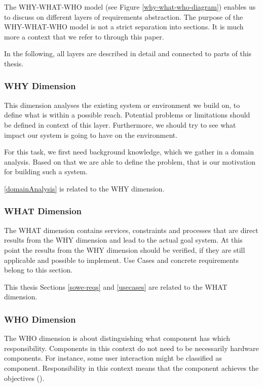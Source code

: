 The WHY-WHAT-WHO model (see Figure \ref{why-what-who-diagram}) enables us to discuss on different layers of requirements abstraction. The purpose of the WHY-WHAT-WHO model is not a strict separation into sections. It is much more a context that we refer to through this paper.

In the following, all layers are described in detail and connected to parts of this thesis. 

\subsubsection{WHY Dimension}
This dimension analyses the existing system or environment 
we build on, to define what is within a possible reach. Potential problems or limitations should be defined in context of this layer. Furthermore, we should try to see what impact our system is going to have on the environment. 

For this task, we first need background knowledge, which we gather in a domain analysis. Based on that we are able to define the problem, that is our motivation for building such a system. 

 \ref{domainAnalysis} is related to the WHY dimension.

\subsubsection{WHAT Dimension}

The WHAT dimension contains services, constraints and processes that are direct results from the WHY dimension and lead to the actual goal system. At this point the results from the WHY dimension should be verified, if they are still applicable and possible to implement. Use Cases and concrete requirements belong to this section. 

This thesis Sections \ref{sowe-reqs}  and \ref{usecases}  are related to the WHAT dimension.

\subsubsection{WHO Dimension}

The WHO dimension is about distinguishing what component has which responsibility. Components in this context do not need to be necessarily hardware components. For instance, some user interaction might be classified as component. Responsibility in this context means that the component achieves the objectives (\cite{van2009requirements}).

